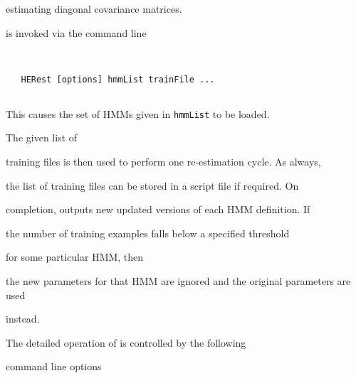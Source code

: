estimating diagonal covariance matrices.










 is invoked via the command line


\begin{verbatim}


   HERest [options] hmmList trainFile ...


\end{verbatim}


This causes the set of HMMs given in {\tt hmmList} to be loaded.


The given list of


training files is then used to perform one re-estimation cycle. As always,


the list of training files can be stored in a script file if required.  On


completion,  outputs new updated versions of each HMM definition. If


the number of training examples falls below a specified threshold 


for some particular HMM, then


the new parameters for that HMM are ignored and the original parameters are used 


instead.





The detailed operation of  is controlled by the following


command line options


